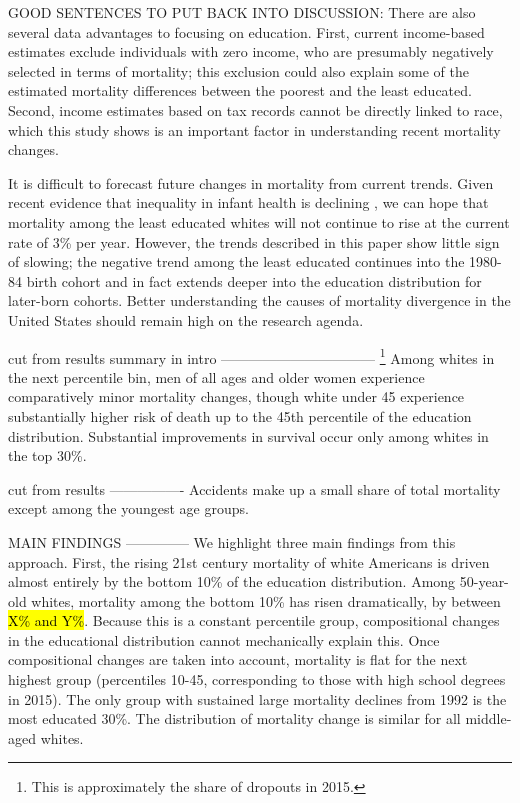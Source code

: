 \begin{center}
GOOD SENTENCES TO PUT BACK INTO DISCUSSION: There are also several
data advantages to focusing on education. First, current income-based
estimates exclude individuals with zero income, who are presumably
negatively selected in terms of mortality; this exclusion could also
explain some of the estimated mortality differences between the
poorest and the least educated. Second, income estimates based on tax
records cannot be directly linked to race, which this study shows is
an important factor in understanding recent mortality changes.


It is difficult to forecast future changes in mortality from current
trends. Given recent evidence that inequality in infant health is
declining \cite{Currie2018}, we can hope that mortality among the
least educated whites will not continue to rise at the current rate of
3\% per year. However, the trends described in this paper show little
sign of slowing; the negative trend among the least educated continues
into the 1980-84 birth cohort and in fact extends deeper into the
education distribution for later-born cohorts. Better understanding the
causes of mortality divergence in the United States should remain high
on the research agenda.



cut from results summary in intro
---------------------------------
\footnote{This
  is approximately the share of dropouts in 2015.} Among whites in the
next percentile bin, men of all ages and older women experience
comparatively minor mortality changes, though white under 45 experience
substantially higher risk of death up to the 45th percentile of the
education distribution. Substantial improvements in survival occur
only among whites in the top 30\%.

cut from results
----------------
Accidents make up a small share of total mortality except
among the youngest age groups.




MAIN FINDINGS
--------------
We highlight three main findings from this approach. First, the rising
21st century mortality of white Americans is driven almost entirely by
the bottom 10\% of the education distribution. Among 50-year-old
whites, mortality among the bottom 10\% has risen dramatically, by
between \hl{X\% and Y\%}. Because this is a constant percentile group,
compositional changes in the educational distribution cannot
mechanically explain this. Once compositional changes are taken into
account, mortality is flat for the next highest group (percentiles
10-45, corresponding to those with high school degrees in 2015). The
only group with sustained large mortality declines from 1992 is the
most educated 30\%. The distribution of mortality change is similar
for all middle-aged whites.


\end{center}
